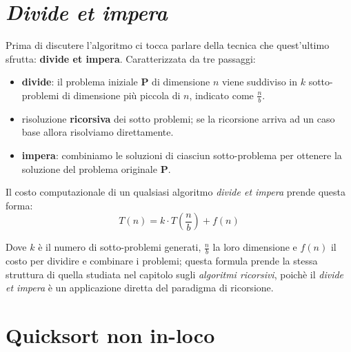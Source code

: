 \documentclass{article}
\begin{document}
\section*{\textit{Divide et impera}}
Prima di discutere l'algoritmo ci tocca parlare della tecnica che quest'ultimo
sfrutta: \textbf{divide et impera}.
Caratterizzata da tre passaggi:
\begin{itemize}
  \item \textbf{divide}: il problema iniziale \textbf{P} di dimensione $n$ 
  viene suddiviso in $k$ sotto-problemi di dimensione più piccola di $n$,
  indicato come $\frac{n}{b}$.
  \item risoluzione \textbf{ricorsiva} dei sotto problemi; se la ricorsione
  arriva ad un caso base allora risolviamo direttamente.
  \item \textbf{impera}: combiniamo le soluzioni di ciasciun sotto-problema
  per ottenere la soluzione del problema originale \textbf{P}.
\end{itemize}

Il costo computazionale di un qualsiasi algoritmo \textit{divide et impera}
prende questa forma:
\[ T(n) = k \cdot T(\frac{n}{b}) + f(n) \]

Dove $k$ è il numero di sotto-problemi generati, $\frac{n}{b}$ la loro dimensione
e $f(n)$ il costo per dividire e combinare i problemi; questa formula prende la
stessa struttura di quella studiata nel capitolo sugli \textit{algoritmi ricorsivi},
poichè il \textit{divide et impera} è un applicazione diretta del paradigma di 
ricorsione.

\section*{Quicksort non in-loco}
\vspace{0.3cm}


\begin{algorithm}[H]
\renewcommand{\thealgocf}{}
\caption{Ordina l'array}
\end{algorithm}
\vspace{0.3cm}
\end{document}
